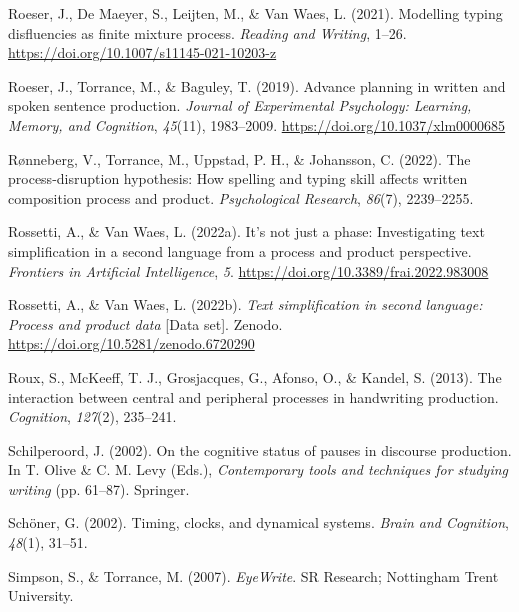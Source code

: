 \documentclass[
  man,floatsintext]{apa7}
\newlength{\cslhangindent}
\newlength{\cslentryspacingunit} %
\newenvironment{CSLReferences}[2] %
 {%
  \setlength{\parindent}{0pt}
  \ifodd #1
  \let\oldpar\par
  \def\par{\hangindent=\cslhangindent\oldpar}
  \fi
  \setlength{\parskip}{#2\cslentryspacingunit}
 }%
 {}
\begin{document}
\begin{CSLReferences}{1}{0}
\leavevmode{}%
Roeser, J., De Maeyer, S., Leijten, M., \& Van Waes, L. (2021). Modelling typing disfluencies as finite mixture process. \emph{Reading and Writing}, 1--26. \url{https://doi.org/10.1007/s11145-021-10203-z}

\leavevmode{}%
Roeser, J., Torrance, M., \& Baguley, T. (2019). Advance planning in written and spoken sentence production. \emph{Journal of Experimental Psychology: Learning, Memory, and Cognition}, \emph{45}(11), 1983--2009. \url{https://doi.org/10.1037/xlm0000685}

\leavevmode{}%
Rønneberg, V., Torrance, M., Uppstad, P. H., \& Johansson, C. (2022). The process-disruption hypothesis: How spelling and typing skill affects written composition process and product. \emph{Psychological Research}, \emph{86}(7), 2239--2255.

\leavevmode{}%
Rossetti, A., \& Van Waes, L. (2022a). It's not just a phase: Investigating text simplification in a second language from a process and product perspective. \emph{Frontiers in Artificial Intelligence}, \emph{5}. \url{https://doi.org/10.3389/frai.2022.983008}

\leavevmode{}%
Rossetti, A., \& Van Waes, L. (2022b). \emph{Text simplification in second language: Process and product data} {[}Data set{]}. Zenodo. \url{https://doi.org/10.5281/zenodo.6720290}

\leavevmode{}%
Roux, S., McKeeff, T. J., Grosjacques, G., Afonso, O., \& Kandel, S. (2013). The interaction between central and peripheral processes in handwriting production. \emph{Cognition}, \emph{127}(2), 235--241.

\leavevmode{}%
Schilperoord, J. (2002). On the cognitive status of pauses in discourse production. In T. Olive \& C. M. Levy (Eds.), \emph{Contemporary tools and techniques for studying writing} (pp. 61--87). Springer.

\leavevmode{}%
Schöner, G. (2002). Timing, clocks, and dynamical systems. \emph{Brain and Cognition}, \emph{48}(1), 31--51.

\leavevmode{}%
Simpson, S., \& Torrance, M. (2007). \emph{EyeWrite}. SR Research; Nottingham Trent University.


\end{CSLReferences}
\end{document}
